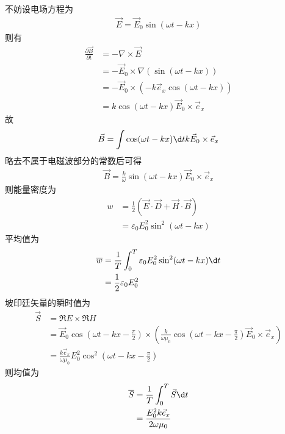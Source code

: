 \documentclass{phyasgn}
\begin{document}
\begin{sol}[5]
    不妨设电场方程为
    \begin{align*}
        \vec{E}=\vec{E}_0\sin(\omega t-kx)
    \end{align*}
    则有
    \begin{align*}
        \frac{\partial \vec{B}}{\partial t}&=-\nabla\times\vec{E}\\
        &=-\vec{E}_0\times\nabla(\sin(\omega t-kx))\\
        &=-\vec{E}_0\times(-k\vec{e}_x\cos(\omega t-kx))\\
        &=k\cos(\omega t-kx)\vec{E}_0\times\vec{e}_x
    \end{align*}
    故
    \begin{align*}
        \vec{B}&=\int \cos(\omega t-kx)\d tk\vec{E}_0\times\vec{e}_x\\
    \end{align*}
    略去不属于电磁波部分的常数后可得
    \begin{align*}
        \vec{B}=\frac{k}{\omega}\sin(\omega t-kx)\vec{E}_0\times\vec{e}_x
    \end{align*}
    则能量密度为
    \begin{align*}
        w&=\frac{1}{2}(\vec{E}\cdot\vec{D}+\vec{H}\cdot\vec{B})\\
        &=\varepsilon_0E_0^2\sin^2(\omega t-kx)
    \end{align*}
    平均值为
    \begin{align*}
        \overline{w}&=\frac{1}{T}\int_{0}^{T}\varepsilon_0E_0^2\sin^2(\omega t-kx)\d t\\
        &=\frac{1}{2}\varepsilon_0E_0^2
    \end{align*}
    坡印廷矢量的瞬时值为
    \begin{align*}
        \vec{S}&=\Re E\times\Re H\\
        &=\vec{E}_0\cos(\omega t-kx-\frac{\pi}{2})\times(\frac{k}{\omega\mu_0}\cos(\omega t-kx-\frac{\pi}{2})\vec{E}_0\times\vec{e}_x)\\
        &=\frac{k\vec{e}_x}{\omega\mu_0}E_0^2\cos^2(\omega t-kx-\frac{\pi}{2})
    \end{align*}
    则均值为
    \begin{align*}
        \overline{S}&=\frac{1}{T}\int_{0}^{T}\vec{S}\d t\\
        &=\frac{E_0^2k\vec{e}_x}{2\omega\mu_0}
    \end{align*}
\end{sol}\par
\end{document}
